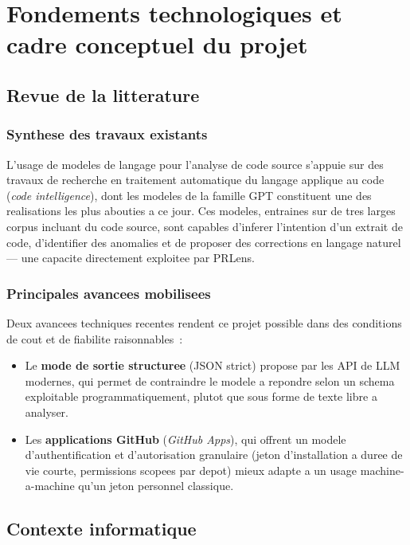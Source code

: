 \documentclass[a4paper,12pt,oneside]{report}
\begin{document}
\chapter{Fondements technologiques et cadre conceptuel du projet}

\section{Revue de la litterature}

\subsection{Synthese des travaux existants}

L'usage de modeles de langage pour l'analyse de code source s'appuie sur des travaux de recherche en traitement automatique du langage applique au code (\emph{code intelligence}), dont les modeles de la famille GPT constituent une des realisations les plus abouties a ce jour. Ces modeles, entraines sur de tres larges corpus incluant du code source, sont capables d'inferer l'intention d'un extrait de code, d'identifier des anomalies et de proposer des corrections en langage naturel --- une capacite directement exploitee par PRLens.

\subsection{Principales avancees mobilisees}

Deux avancees techniques recentes rendent ce projet possible dans des conditions de cout et de fiabilite raisonnables~:

\begin{itemize}
  \item Le \textbf{mode de sortie structuree} (JSON strict) propose par les API de LLM modernes, qui permet de contraindre le modele a repondre selon un schema exploitable programmatiquement, plutot que sous forme de texte libre a analyser.
  \item Les \textbf{applications GitHub} (\emph{GitHub Apps}), qui offrent un modele d'authentification et d'autorisation granulaire (jeton d'installation a duree de vie courte, permissions scopees par depot) mieux adapte a un usage machine-a-machine qu'un jeton personnel classique.
\end{itemize}

\section{Contexte informatique}
\end{document}
